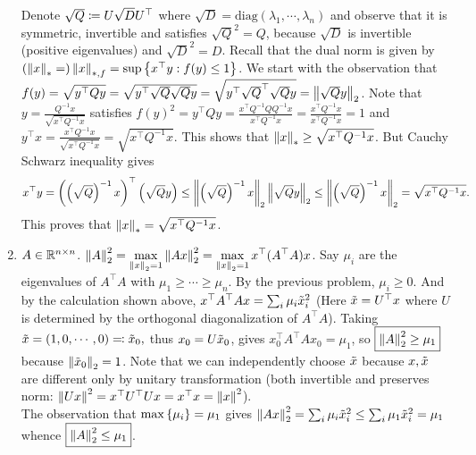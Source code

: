 \begin{enumerate}[leftmargin=*]
Denote $\sqrt{Q}\coloneqq U \sqrt D U^\top$ where $\sqrt D=\text{diag}({\lambda_1},\cdots,{\lambda_n})$ and observe that it is symmetric, invertible and satisfies $\sqrt Q^2 = Q$, because $\sqrt{D}$ is invertible (positive eigenvalues) and $\sqrt D^2=D$.
Recall that the dual norm is given by $\left(\left\lVert x \right\rVert_{*}=\right)\left\lVert x \right\rVert_{*,f} = \sup\left\{x^\top y : f(y)\leq 1\right\}$. We start with the observation that $f(y) = \sqrt{y^\top Q y} = \sqrt{y^\top \sqrt Q \sqrt Q y} = \sqrt{y^\top \sqrt Q^\top \sqrt Q y} = \left\lVert \sqrt Qy \right\rVert_{2}$. 
Note that $y=\frac{Q^{-1}x}{\sqrt{x^\top Q^{-1}x}}$ satisfies $f(y)^2 = y^\top Q y = \frac{x^\top Q^{-1} Q Q^{-1}x}{x^\top Q^{-1}x} = \frac{x^\top Q^{-1}x}{x^\top Q^{-1}x} = 1$ and $y^\top x= \frac{x^\top Q^{-1}x}{\sqrt{x^\top Q^{-1}x}} = \sqrt{x^\top Q^{-1}x}$. This shows that $\left\lVert x \right\rVert_{*} \geq \sqrt{x^\top Q^{-1}x}$. But Cauchy Schwarz inequality gives 
$$x^\top y = \left(\left(\sqrt Q\right)^{-1} x\right)^\top\left(\sqrt Qy\right)\leq \left\lVert \left(\sqrt Q\right)^{-1}x \right\rVert_{2}\left\lVert \sqrt Qy \right\rVert_{2} \leq \left\lVert \left(\sqrt Q\right)^{-1}x \right\rVert_{2}=\sqrt{x^\top Q^{-1}x}.$$ This proves that $\left\lVert x \right\rVert_{*} = \sqrt{x^\top Q^{-1}x}$.

\item $A\in\mathbb{R}^{n\times n}$. $\displaystyle\left\lVert A \right\rVert_{2} ^2 = \max_{\left\lVert x \right\rVert_{2} = 1}\left\lVert Ax \right\rVert_{2}^2 = \max_{\left\lVert x \right\rVert_{2} = 1} x^\top (A^\top A)x$. Say $\mu_i$ are the eigenvalues of $A^\top A$ with $\mu_1\geq\cdots\geq \mu_n$. By the previous problem, $\mu_i\geq 0$. And by the calculation shown above, $x^\top A^\top Ax = \sum_i\mu_i{\tilde{x}}_i^2$ (Here ${\tilde{x}} = U^{\top}x$ where $U$ is determined by the orthogonal diagonalization of $A^{\top}A$). Taking ${\tilde{x}} = (1,0,\cdots,0) \eqqcolon {\tilde{x}}_0,$ thus $x_{0}=U{\tilde{x}}_{0}$, gives $x_{0}^\top A^\top Ax_{0} = \mu_1$, so $\boxed{\left\lVert A \right\rVert_{2} ^2 \ge \mu_1}$ because $\left\lVert {\tilde{x}}_0 \right\rVert_{2}=1$. Note that we can independently choose ${\tilde{x}}$ because $x,{\tilde{x}}$ are different only by unitary transformation (both invertible and preserves norm: $\left\lVert Ux \right\rVert_{}^2 = x^\top U^\top U x = x^\top x = \left\lVert x \right\rVert_{}^2$).
\\
The observation that $\max\left\{\mu_i\right\}=\mu_1$ gives $\left\lVert Ax \right\rVert_{2}^2 = \sum_i\mu_i{\tilde{x}}_i^2 \leq \sum_i \mu_1 {\tilde{x}}_i^2 = \mu_1$ whence $\boxed{\left\lVert A \right\rVert_{2} ^2 \leq \mu_1}$.
\end{enumerate}














